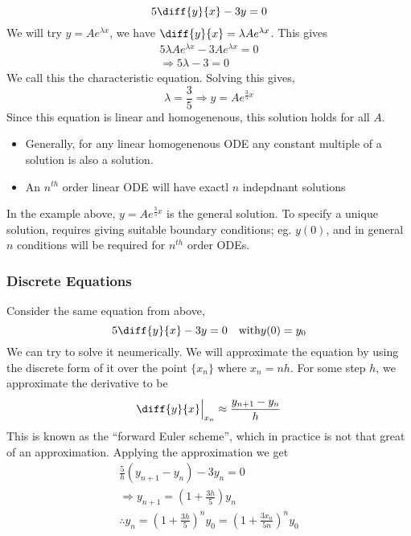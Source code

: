 \documentclass{article}
\begin{document}
\begin{eg}
    \[
        5 \diff{y}{x} - 3y = 0  
    \]
    We will try $y = Ae^{\lambda x}$, we have $\diff{y}{x} = \lambda A e^{\lambda x}$. This gives
    \begin{align*}
        5\lambda A e^{\lambda x} - 3Ae^{\lambda x} = 0 \\
        \Rightarrow 5\lambda - 3 = 0
    \end{align*}
    We call this the characteristic equation. Solving this gives,
    \[
        \lambda = \frac{3}{5} \Rightarrow y = Ae^{\frac{3}{5} x}   
    \]
    Since this equation is linear and homogenenous, this solution holds for all $A$.
\end{eg}

\begin{remark}\leavevmode
    \begin{itemize}
        \item Generally, for any linear homogenenous ODE any constant multiple of a solution is also a solution.
        \item An $n^{th}$ order linear ODE will have exactl $n$ indepdnant solutions
    \end{itemize}
    In the example above, $y = Ae^{\frac{3}{5} x}$ is the general solution. To specify a unique solution, requires giving suitable boundary conditions; eg. $y(0)$, and in general $n$ conditions will be required for $n^{th}$ order ODEs.
\end{remark}

\subsubsection{Discrete Equations}

Consider the same equation from above,
\[
    5 \diff{y}{x} - 3y = 0 \quad \text{with} y(0) = y_0
\]
We can try to solve it neumerically. We will approximate the equation by using the discrete form of it over the point $\{x_n\}$ where $x_n = nh$. For some step $h$, we approximate the derivative to be
\[
    \diff{y}{x}\Big{|}_{x_n} \approx \frac{y_{n+1} - y_n}{h}    
\]
This is known as the ``forward Euler scheme'', which in practice is not that great of an approximation. Applying the approximation we get
\begin{align*}
    \frac{5}{h}(y_{n+1} - y_n) - 3y_n = 0 \\
    \Rightarrow y_{n+1} = (1 + \frac{3h}{5})y_{n} \\
    \therefore y_n = (1 + \frac{3h}{5})^ny_0 = (1 + \frac{3x_n}{5n})^ny_0 \tag{$x_n = nh$}
\end{align*}
\end{document}
